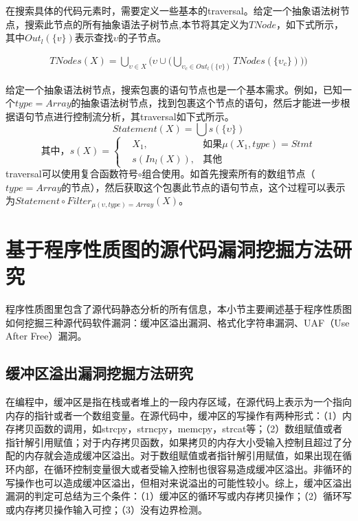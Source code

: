 {在搜索具体的代码元素时，需要定义一些基本的traversal。给定一个抽象语法树节点，搜索此节点的所有抽象语法子树节点,本节将其定义为$TNode$，如下式所示，其中$Out_{l} (\{v \})$表示查找$\upsilon$的子节点。

\begin{align*}
TNodes(X) = \bigcup_{\upsilon \in X} \big(\upsilon \cup \big( \bigcup_{\upsilon_{c} \in Out_{l} (\{v \}) } TNodes(\{\upsilon_{c} \}) \big) \big)
\end{align*}

给定一个抽象语法树节点，搜索包裹的语句节点也是一个基本需求。例如，已知一个$type=Array$的抽象语法树节点，找到包裹这个节点的语句，然后才能进一步根据语句节点进行控制流分析，其traversal如下式所示。
$$
Statement(X) = \bigcup s(\{ \upsilon \})
$$
$$
\text{其中，}s(X)=\left\{
\begin{aligned}
& X_{1}, & \text{如果} \mu(X_{1}, type)=Stmt \\
& s(In_{l} (X)), & \text{其他}
\end{aligned}
\right.
$$
traversal可以使用复合函数符号$\circ$组合使用。如首先搜索所有的数组节点{（$type=Array$的节点）}，然后获取这个包裹此节点的语句节点，这个过程可以表示为$Statement \circ Filter_{\mu (\upsilon, type) = Array} (X)$。

\section{基于程序性质图的源代码漏洞挖掘方法研究}\label{基于程序性质图的源代码漏洞粗定位方法研究}
程序性质图里包含了源代码静态分析的所有信息，本小节主要阐述基于程序性质图如何挖掘三种源代码软件漏洞：缓冲区溢出漏洞、格式化字符串漏洞、UAF（Use After Free）漏洞。

\subsection{缓冲区溢出漏洞挖掘方法研究}
\label{缓冲区溢出漏洞检测}


在编程中，缓冲区是指在栈或者堆上的一段内存区域，在源代码上表示为一个指向内存的指针或者一个数组变量。在源代码中，缓冲区的写操作有两种形式：（1）内存拷贝函数的调用，如strcpy，strncpy，memcpy，strcat等；（2）数组赋值或者指针解引用赋值；对于内存拷贝函数，如果拷贝的内存大小受输入控制且超过了分配的内存就会造成缓冲区溢出。对于数组赋值或者指针解引用赋值，如果出现在循环内部，在循环控制变量很大或者受输入控制也很容易造成缓冲区溢出。非循环的写操作也可以造成缓冲区溢出，但相对来说溢出的可能性较小。综上，缓冲区溢出漏洞的判定可总结为三个条件：（1）缓冲区的循环写或内存拷贝操作；（2）循环写或内存拷贝操作输入可控；（3）没有边界检测。

}
